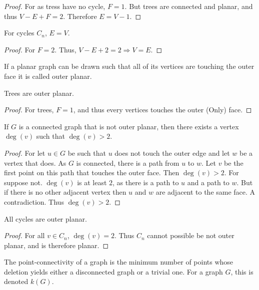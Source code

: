 \documentclass[crop=false,class=book,oneside]{standalone}
\begin{document}
        \begin{proof}
        For as tress have no cycle, $F=1$. But trees are connected and planar, and thus $V-E+F = 2$. Therefore $E=V-1$.
        \end{proof}
        \begin{corollary}
        For cycles $C_n$, $E=V$.
        \end{corollary}
        \begin{proof}
        For $F=2$. Thus, $V-E+2=2\Rightarrow V=E$.
        \end{proof}
        \begin{definition}
        If a planar graph can be drawn such that all of its vertices are touching the outer face it is called outer planar.
        \end{definition}
        \begin{corollary}
        Trees are outer planar.
        \end{corollary}
        \begin{proof}
        For trees, $F=1$, and thus every vertices touches the outer (Only) face.
        \end{proof}
        \begin{lemma}
        If $G$ is a connected graph that is not outer planar, then there exists a vertex $\deg(v)$ such that $\deg(v)>2$.
        \end{lemma}
        \begin{proof}
        For let $u \in G$ be such that $u$ does not touch the outer edge and let $w$ be a vertex that does. As $G$ is connected, there is a path from $u$ to $w$. Let $v$ be the first point on this path that touches the outer face. Then $\deg(v)>2$. For suppose not. $\deg(v)$ is at least $2$, as there is a path to $u$ and a path to $w$. But if there is no other adjacent vertex then $u$ and $w$ are adjacent to the same face. A contradiction. Thus $\deg(v)>2$.
        \end{proof}
        \begin{corollary}
        All cycles are outer planar.
        \end{corollary}
        \begin{proof}
        For all $v\in C_n$, $\deg(v)=2$. Thus $C_n$ cannot possible be not outer planar, and is therefore planar.
        \end{proof}
        \begin{definition}
        The point-connectivity of a graph is the minimum number of points whose deletion yields either a disconnected graph or a trivial one. For a graph $G$, this is denoted $k(G)$.
        \end{definition}
\end{document}
